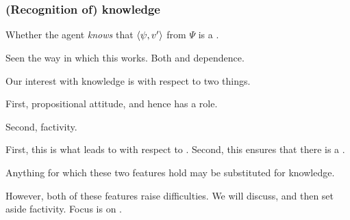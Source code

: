 \chapter{}
\label{cha:know}

\subsection{(Recognition of) knowledge}
\label{sec:knowledge}

\begin{note}
  Whether the agent \emph{knows} that \(\langle \psi, v' \rangle\) from \(\Psi\) is a \fc{}.
\end{note}

\begin{note}
  Seen the way in which this works.
  Both \ros{} and dependence.
\end{note}

\begin{note}
  Our interest with knowledge is with respect to two things.

  First, propositional attitude, and hence has a role.

  Second, factivity.

  First, this is what leads to \influence{} with respect to \requ{}.
  Second, this ensures that there is a \ros{}.

  Anything for which these two features hold may be substituted for knowledge.

  However, both of these features raise difficulties.
  We will discuss, and then set aside factivity.
  Focus is on \influence{}.
\end{note}

